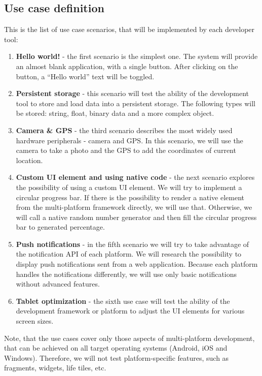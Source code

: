 \documentclass[english,master,public,dept460,male,cpdeclaration,oneside]{diploma}
\begin{document}
\subsection{Use case definition}
This is the list of use case scenarios, that will be implemented by each developer tool:

\begin{enumerate}
	\item \textbf{Hello world! }- the first scenario is the simplest one. The system will provide an almost blank application, with a single button. After clicking on the button, a “Hello world” text will be toggled.
	\item \textbf{Persistent storage }- this scenario will test the ability of the development tool to store and load data into a persistent storage. The following types will be stored: string, float, binary data and a more complex object.
	\item \textbf{Camera \& GPS }- the third scenario describes the most widely used hardware peripherals - camera and GPS. In this scenario, we will use the camera to take a photo and the GPS to add the coordinates of current location.
	\item \textbf{Custom UI element and using native code }- the next scenario explores the possibility of using a custom UI element. We will try to implement a circular progress bar. If there is the possibility to render a native element from the multi-platform framework directly, we will use that. Otherwise, we will call a native random number generator and then fill the circular progress bar to generated percentage.
	\item \textbf{Push notifications }- in the fifth scenario we will try to take advantage of the notification API of each platform. We will research the possibility to display push notifications sent from a web application. Because each platform handles the notifications differently, we will use only basic notifications without advanced features.
	\item \textbf{Tablet optimization} - the sixth use case will test the ability of the development framework or platform to adjust the UI elements for various screen sizes.
\end{enumerate}

Note, that the use cases cover only those aspects of multi-platform development, that can be achieved on all target operating systems (Android, iOS and Windows). Therefore, we will not test platform-specific features, such as fragments, widgets, life tiles, etc.
\end{document}
